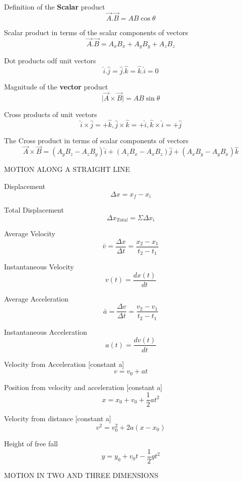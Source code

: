 \documentclass[12pt, letterpaper, twoside]{article}
\begin{document}
Definition of the \textbf{Scalar} product
$$\overrightarrow{A} . \overrightarrow{B}= AB \cos \theta$$


Scalar product in terms of the scalar components of vectors
$$\overrightarrow{A} . \overrightarrow{B}= A_x B_x + A_y B_y + A_z B_z$$



Dot products odf unit vectors
$$\hat{i} . \hat{j} = \hat{j} . \hat{k} = \hat{k} . \hat{i} = 0$$



Magnitude of the \textbf{vector} product
$$\mid \overrightarrow{A} \times \overrightarrow{B} \mid= AB \sin \theta$$



Cross products of unit vectors
$$\hat{i} \times \hat{j} =+ \hat{k}, \hat{j} \times \hat{k} = +\hat{i}, \hat{k} \times \hat{i} =+ \hat{j}$$
 



The Cross product in terms of scalar components of vectors
$$\overrightarrow{A} \times \overrightarrow{B} = (A_y B_z - A_z B_y) \hat{i} + (A_z B_x - A_x B_z) \hat{j} + (A_x B_y - A_y B_x) \hat{k}$$



\newpage

MOTION ALONG A STRAIGHT LINE
$$ $$



Displacement
$$\Delta x = x_f - x_i$$


Total Displacement
$$\Delta x_{Total} = \Sigma \Delta x_i$$

Average Velocity
$$\bar{v} = \frac{\Delta x}{\Delta t} = \frac{x_2 - x_1}{t_2 - t_1}$$

Instantaneous Velocity
$$v(t) = \frac{dx(t)}{dt}$$

Average Acceleration
$$\bar{a} = \frac{\Delta v}{\Delta t} = \frac{v_2 - v_1}{t_2 - t_1}$$

Instantaneous Acceleration
$$a(t) = \frac{dv(t)}{dt}$$

Velocity from Acceleration [constant a]
$$v = v_0 + at$$

Position from velocity and acceleration [constant a]
$$x = x_0 + v_0 + \frac{1}{2} a t^2$$

Velocity from distance [constant a]
$$v^2 = v_0^2 + 2a(x - x_0)$$

Height of free fall
$$y = y_0 + v_0 t - \frac{1}{2} g t^2$$


\newpage

MOTION IN TWO AND THREE DIMENSIONS
\end{document}
